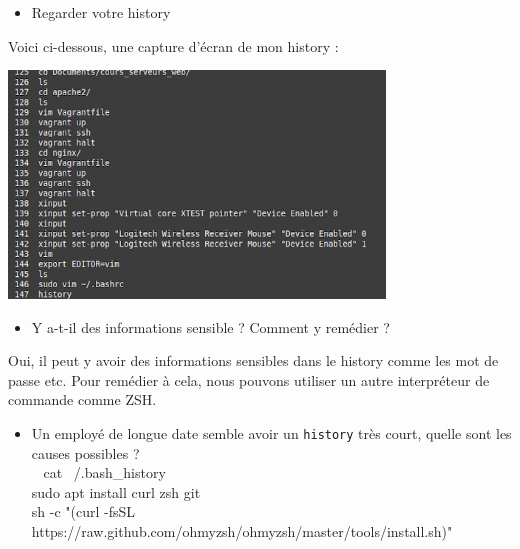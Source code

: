 \documentclass[12pt]{article}
\begin{document}
\begin{itemize}
  \item Regarder votre history
\end{itemize}

\vspace{0.3cm}

Voici ci-dessous, une capture d'écran de mon history : 

\begin{center}
  \includegraphics[width=10cm]{Image-TD-4/history.png}
\end{center}

\vspace{0.3cm}

\begin{itemize}
  \item Y a-t-il des informations sensible ? Comment y remédier ?
\end{itemize}

\vspace{0.3cm}

Oui, il peut y avoir des informations sensibles dans le history comme les mot de passe etc. Pour remédier à cela, nous pouvons utiliser un autre interpréteur de commande comme ZSH.

\vspace{0.3cm}

\begin{itemize}
  \item Un employé de longue date semble avoir un \texttt{history} très court, quelle sont les causes possibles ?\\
  \vspace{0.3cm}
  ~ cat ~/.bash\_history\\
  \vspace{0.3cm}
  sudo apt install curl zsh git\\
  \vspace{0.3cm}
  sh -c "(curl -fsSL https://raw.github.com/ohmyzsh/ohmyzsh/master/tools/install.sh)" 
\end{itemize}
\end{document}
